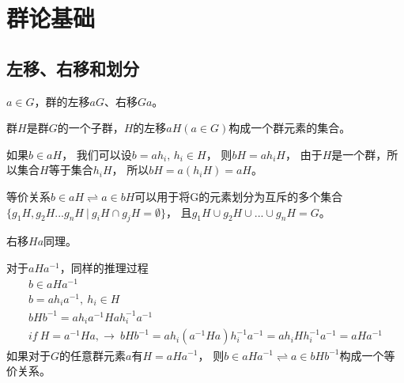\section{群论基础}

\subsection{}

\subsection{左移、右移和划分}

$a\in G$，群的左移$aG$、右移$Ga$。

群$H$是群$G$的一个子群，$H$的左移$aH(a\in G)$构成一个群元素的集合。

如果$b\in aH$，
我们可以设$b= ah_{i},\,h_{i}\in H$，
则$bH=ah_{i}H$，
由于$H$是一个群，所以集合$H$等于集合$h_{i}H$，
所以$bH=a(h_{i}H)=aH$。

等价关系$b\in aH\rightleftharpoons a\in bH$可以用于将G的元素划分为互斥的多个集合
$\{g_{1}H,g_{2}H...g_{n}H\ |\ g_{i}H\cap g_{j}H=\emptyset\}$，
且$g_{1}H\cup g_{2}H\cup ...\cup g_{n}H=G$。

右移$Ha$同理。

对于$aHa^{-1}$，同样的推理过程
\begin{gather}
    b\in aHa^{-1}\\
    b=ah_{i}a^{-1},\ h_{i}\in H\\
    bHb^{-1}=ah_{i}a^{-1}Hah_{i}^{-1}a^{-1}\\
    if\ H=a^{-1}Ha,\rightarrow
    \ bHb^{-1}=ah_{i}(a^{-1}Ha)h_{i}^{-1}a^{-1}=ah_{i}Hh_{i}^{-1}a^{-1}=aHa^{-1}
\end{gather}
如果对于$G$的任意群元素$a$有$H=aHa^{-1}$，
则$b\in aHa^{-1}\rightleftharpoons a\in bHb^{-1}$构成一个等价关系。
